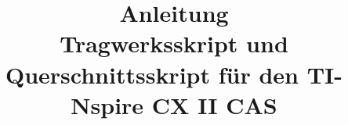 




\documentclass[11pt,a4paper]{article}

\usepackage[utf8]{inputenc}
\usepackage[T1]{fontenc}
\usepackage[ngerman]{babel}
\usepackage[a4paper,margin=2.4cm]{geometry}
\usepackage{amsmath}
\usepackage{amssymb}
\usepackage{array}
\usepackage{booktabs}
\usepackage{longtable}
\usepackage{graphicx}
\usepackage{subcaption}   %
\usepackage{xcolor}
\usepackage{tikz}
\usepackage[autostyle,german=quotes]{csquotes}
\usepackage[hidelinks]{hyperref}

\setlength{\parindent}{0pt}
\setlength{\parskip}{0.6em}

\newcommand{\taste}[1]{\textsf{\textbf{#1}}}
\newcommand{\code}[1]{\texttt{#1}}


\title{Anleitung\\[0.3em]\large Tragwerksskript und Querschnittsskript für den TI-Nspire CX II CAS}
\author{}
\date{}


\maketitle


